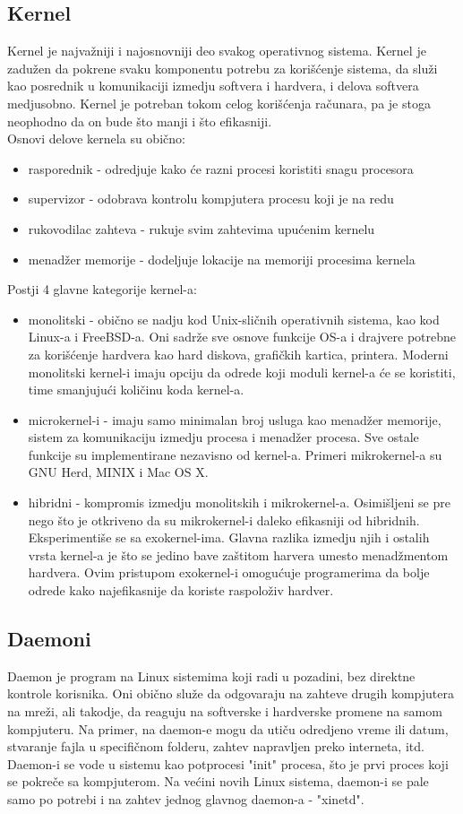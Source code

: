 \subsection{Kernel}
Kernel je najvažniji i najosnovniji deo svakog operativnog sistema. Kernel je zadužen da pokrene svaku komponentu potrebu za korišćenje sistema, da služi kao posrednik u komunikaciji izmedju softvera i hardvera, i delova softvera medjusobno. Kernel je potreban tokom celog korišćenja računara, pa je stoga neophodno da on bude što manji i što efikasniji.\\
Osnovi delove kernela su obično:
\begin{itemize}
\item rasporednik - odredjuje kako će razni procesi koristiti snagu procesora
\item supervizor - odobrava kontrolu kompjutera procesu koji je na redu
\item rukovodilac zahteva - rukuje svim zahtevima upućenim kernelu
\item menadžer memorije - dodeljuje lokacije na memoriji procesima kernela
\end{itemize}
Postji 4 glavne kategorije kernel-a:
\begin{itemize}
\item monolitski - obično se nadju kod Unix-sličnih operativnih sistema, kao kod Linux-a i FreeBSD-a. Oni sadrže sve osnove funkcije OS-a i drajvere potrebne za korišćenje hardvera kao hard diskova, grafičkih kartica, printera. Moderni monolitski kernel-i imaju opciju da odrede koji moduli kernel-a će se koristiti, time smanjujući količinu koda kernel-a.
\item microkernel-i - imaju samo minimalan broj usluga kao menadžer memorije, sistem za komunikaciju izmedju procesa i menadžer procesa. Sve ostale funkcije su implementirane nezavisno od kernel-a. Primeri mikrokernel-a su GNU Herd, MINIX i Mac OS X.
\item hibridni - kompromis izmedju monolitskih i mikrokernel-a. Osimišljeni se pre nego što je otkriveno da su mikrokernel-i daleko efikasniji od hibridnih.
Eksperimentiše se sa exokernel-ima. Glavna razlika izmedju njih i ostalih vrsta kernel-a je što se jedino bave zaštitom harvera umesto menadžmentom hardvera. Ovim pristupom exokernel-i omogućuje programerima da bolje odrede kako najefikasnije da koriste raspoloživ hardver.
\end{itemize}
\cite{kernel}

\subsection{Daemoni}
Daemon je program na Linux sistemima koji radi u pozadini, bez direktne kontrole korisnika. Oni obično služe da odgovaraju na zahteve drugih kompjutera na mreži, ali takodje, da reaguju na softverske i hardverske promene na samom kompjuteru. Na primer, na daemon-e mogu da utiču odredjeno vreme ili datum, stvaranje fajla u specifičnom folderu, zahtev napravljen preko interneta, itd.
Daemon-i se vode u sistemu kao potprocesi "init" procesa, što je prvi proces koji se pokreče sa kompjuterom. Na većini novih Linux sistema, daemon-i se pale samo po potrebi i na zahtev jednog glavnog daemon-a - "xinetd". \cite{daemon}

